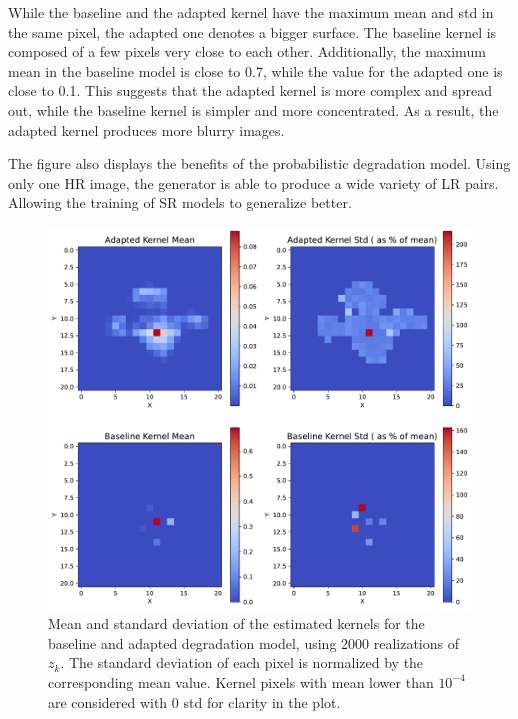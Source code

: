         While the baseline and the adapted kernel have the maximum mean and std in the same pixel, the adapted one denotes a bigger surface.  
        The baseline kernel is composed of a few pixels very close to each other.
        Additionally, the maximum mean in the baseline model is close to 0.7, while the value for the adapted one is close to 0.1.
        This suggests that the adapted kernel is more complex and spread out, while the baseline kernel is simpler and more concentrated.
        As a result, the adapted kernel produces more blurry images.
        
        The figure also displays the benefits of the probabilistic degradation model.
        Using only one HR image, the generator is able to produce a wide variety of LR pairs. Allowing the training of SR models  to generalize better.

        \begin{figure}[H]
            \centering
            \includegraphics[width=\textwidth]{Includes/5-source-kernel-mean-std.pdf}
            \caption{Mean and standard deviation of the estimated kernels for the baseline and adapted degradation model, using 2000 realizations of $z_k$.
                     The standard deviation of each pixel is normalized by the corresponding mean value. Kernel pixels with mean lower than $10^{-4}$ are considered with 0 std for clarity in the plot.}
            \label{fig:5-source-kernel-mean-std}
        \end{figure}

